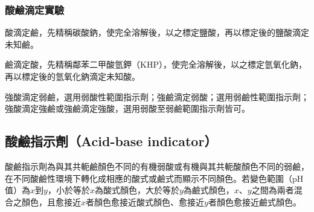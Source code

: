 \documentclass[a4paper,12pt]{article}
\begin{document}
\subsubsection{酸鹼滴定實驗}
\bit
\item 酸滴定鹼，先精稱碳酸鈉，使完全溶解後，以之標定鹽酸，再以標定後的鹽酸滴定未知鹼。
\item 鹼滴定酸，先精稱鄰苯二甲酸氫鉀（KHP），使完全溶解後，以之標定氫氧化鈉，再以標定後的氫氧化鈉滴定未知酸。
\item 強酸滴定弱鹼，選用弱酸性範圍指示劑；強鹼滴定弱酸；選用弱鹼性範圍指示劑；強酸滴定強鹼或強鹼滴定強酸，選用弱酸至弱鹼範圍指示劑皆可。
\eit
\subsection{酸鹼指示劑（Acid-base indicator）}
酸鹼指示劑為與其共軛鹼顏色不同的有機弱酸或有機與其共軛酸顏色不同的弱鹼，在不同酸鹼性環境下轉化成相應的酸式或鹼式而顯示不同顏色。若變色範圍（pH 值）為$x$到$y$，小於等於$x$為酸式顏色，大於等於$y$為鹼式顏色，$x$、$y$之間為兩者混合之顏色，且愈接近$x$者顏色愈接近酸式顏色、愈接近$y$者顏色愈接近鹼式顏色。
\end{document}
